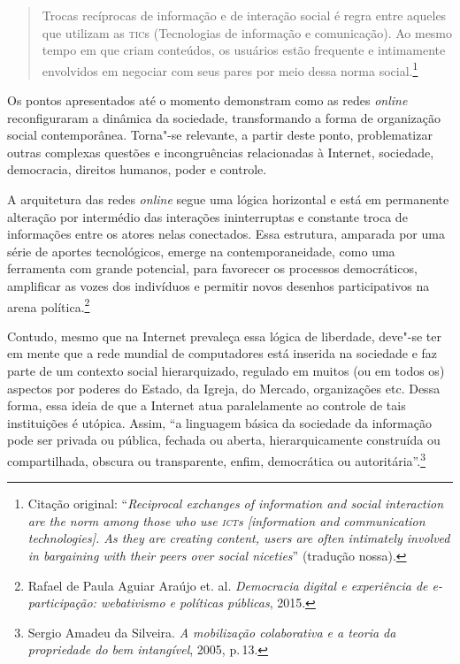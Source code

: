 \begin{quote}
Trocas recíprocas de informação e de interação social é regra entre
aqueles que utilizam as \textsc{tic}s (Tecnologias de informação e comunicação).
Ao mesmo tempo em que criam conteúdos, os usuários estão frequente e
intimamente envolvidos em negociar com seus pares por meio dessa norma
social.\footnote{Citação original: ``\emph{Reciprocal exchanges of information and social interaction are the norm among those who use \textsc{ict}s {[}information and communication
technologies{]}. As they are creating content, users are often
intimately involved in bargaining with their peers over social
niceties}'' (tradução nossa).}
\end{quote}

Os pontos apresentados até o momento demonstram como as redes \emph{online}
reconfiguraram a dinâmica da sociedade, transformando a forma de
organização social contemporânea. Torna"-se relevante, a partir deste
ponto, problematizar outras complexas questões e incongruências
relacionadas à Internet, sociedade, democracia, direitos humanos, poder
e controle.

A arquitetura das redes \emph{online} segue uma lógica horizontal e está em
permanente alteração por intermédio das interações ininterruptas e
constante troca de informações entre os atores nelas conectados. Essa
estrutura, amparada por uma série de aportes tecnológicos, emerge na
contemporaneidade, como uma ferramenta com grande potencial, para
favorecer os processos democráticos, amplificar as vozes dos indivíduos
e permitir novos desenhos participativos na arena política.\footnote{Rafael de Paula Aguiar Araújo et. al. \emph{Democracia digital e experiência de
e-participação: webativismo e políticas públicas}, 2015.}

Contudo, mesmo que na Internet prevaleça essa lógica de liberdade,
deve"-se ter em mente que a rede mundial de computadores está inserida na
sociedade e faz parte de um contexto social hierarquizado, regulado em
muitos (ou em todos os) aspectos por poderes do Estado, da Igreja, do
Mercado, organizações etc. Dessa forma, essa ideia de que a Internet
atua paralelamente ao controle de tais instituições é utópica. Assim,
``a linguagem básica da sociedade da informação pode ser privada ou
pública, fechada ou aberta, hierarquicamente construída ou
compartilhada, obscura ou transparente, enfim, democrática ou
autoritária''.\footnote{Sergio Amadeu da Silveira. \emph{A mobilização colaborativa e a
teoria da propriedade do bem intangível}, 2005, p.\,13.}

